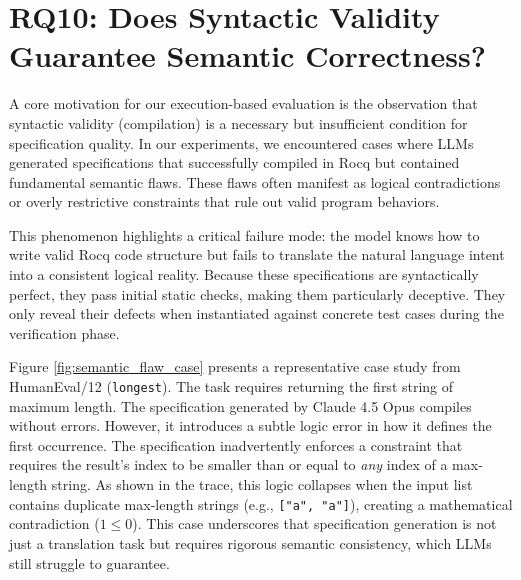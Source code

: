 \section{RQ10: Does Syntactic Validity Guarantee Semantic Correctness?}
\label{appendix:rq10}

A core motivation for our execution-based evaluation is the observation that syntactic validity (compilation) is a necessary but insufficient condition for specification quality. In our experiments, we encountered cases where LLMs generated specifications that successfully compiled in Rocq but contained fundamental semantic flaws. These flaws often manifest as logical contradictions or overly restrictive constraints that rule out valid program behaviors.

This phenomenon highlights a critical failure mode: the model knows how to write valid Rocq code structure but fails to translate the natural language intent into a consistent logical reality. Because these specifications are syntactically perfect, they pass initial static checks, making them particularly deceptive. They only reveal their defects when instantiated against concrete test cases during the verification phase.

Figure \ref{fig:semantic_flaw_case} presents a representative case study from HumanEval/12 (\texttt{longest}). The task requires returning the first string of maximum length. The specification generated by Claude 4.5 Opus compiles without errors. However, it introduces a subtle logic error in how it defines the first occurrence. The specification inadvertently enforces a constraint that requires the result's index to be smaller than or equal to \textit{any} index of a max-length string. As shown in the trace, this logic collapses when the input list contains duplicate max-length strings (e.g., \texttt{["a", "a"]}), creating a mathematical contradiction ($1 \le 0$). This case underscores that specification generation is not just a translation task but requires rigorous semantic consistency, which LLMs still struggle to guarantee.

